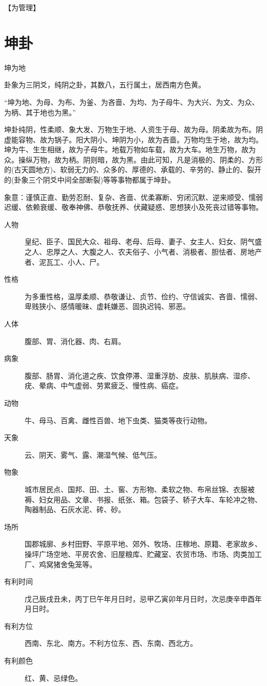 \documentclass[12pt,oneside]{book}
\begin{document}
【为管理】

\section{坤卦}
坤为地

卦象为三阴爻，纯阴之卦，其数八，五行属土，居西南方色黄。

“坤为地、为母、为布、为釜、为吝啬、为均、为子母牛、为大兴、为文、为众、为柄、其于地也为黑。”

坤卦纯阴，性柔顺、象大发、万物生于地、人资生于母、故为母。阴柔故为布。阴虚能容物、故为锅子。阳大阴小、坤阴为小，故为吝啬。万物均生于地，故为均。坤为牛、生生相继，故为子母牛。地载万物如车载，故为大车。地生万物，故为众。操纵万物，故为柄。阴则暗，故为黑。由此可知，凡是消极的、阴柔的、方形的(古天圆地方)、软弱无力的、众多的、厚德的、承载的、辛劳的、静止的、裂开的(卦象三个阴爻中间全部断裂)等等事物都属于坤卦。

象意：谨慎正直、勤劳忍耐、复杂、吝啬、优柔寡断、穷闭沉默、逆来顺受、懦弱迟缓、依赖衰缓、敬奉神佛、恭敬抚养、伏藏疑惑、思想狭小及死丧过错等事物。


\begin{description}
\item[人物] 皇纪、臣子、国民大众、祖母、老母、后母、妻子、女主人、妇女、阴气盛之人、忠厚之人、大腹之人、农夫俗子、小气者、消极者、胆怯者、房地产者、泥瓦工、小人、尸。
\item[性格] 为多重性格，温厚柔顺、恭敬谦让、贞节、俭约、守信诚实、吝啬、懦弱、卑贱狭小、感情暖昧、虚耗嫌恶、固执迟钝、邪恶。
\item[人体] 腹部、胃、消化器、肉、右肩。
\item[病象] 腹部、肠胃、消化道之疾、饮食停滞、湿重浮肪、皮肤、肌肤病、湿疹、疣、晕病、中气虚弱、劳累疲乏、慢性病、癌症。
\item[动物] 牛、母马、百禽、雌性百兽、地下虫类、猫类等夜行动物。
\item[天象] 云、阴天、雾气、露、潮湿气候、低气压。
\item[物象] 城市居民点、国邦、田、土、窖、方形物、柔软之物、布帛丝锦、衣服被褥、妇女用品、文章、书报、纸张、箱。包袋子、轿子大车、车轮冲之物、陶器制品、石灰水泥、砖、砂。
\item[场所] 国郡城廓、乡村田野、平原平地、郊外、牧场、庄稼地、原籍、老家故乡、操坪广场空地、平房农舍、旧屋粮库、贮藏室、农贸市场、市场、肉类加工厂、鸡窝猪舍兔笼等。
\item[有利时间] 戊己辰戌丑未，丙丁巳午年月日时，忌甲乙寅卯年月日时，次忌庚辛申酉年月日时。
\item[有利方位] 西南、东北、南方。不利方位东、西、东南、西北方。
\item[有利颜色] 红、黄、忌绿色。
\end{description}
\end{document}
